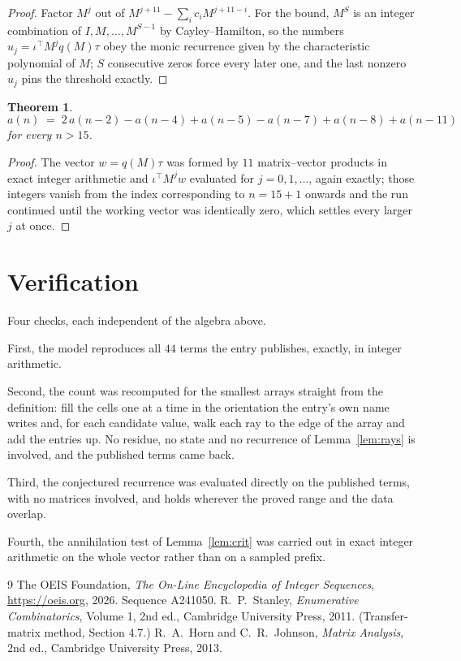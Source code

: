 \documentclass[11pt,a4paper]{article}
\theoremstyle{plain}
\newtheorem{theorem}{Theorem}
\theoremstyle{definition}
\begin{document}
\begin{proof}
Factor $M^{j}$ out of $M^{j+11}-\sum_ic_iM^{j+11-i}$. For the bound, $M^{S}$
is an integer combination of $I,M,\dots,M^{S-1}$ by Cayley--Hamilton, so the numbers
$u_j=\iota^{\!\top}M^{j}q(M)\tau$ obey the monic recurrence given by the characteristic
polynomial of $M$; $S$ consecutive zeros force every later one, and the last nonzero $u_j$
pins the threshold exactly.
\end{proof}

\begin{theorem}
\[
a(n)\;=\;2\,a(n-2) - a(n-4) + a(n-5) - a(n-7) + a(n-8) + a(n-11)
\]
for every $n>15$.
\end{theorem}

\begin{proof}
The vector $w=q(M)\tau$ was formed by $11$ matrix--vector products in exact integer
arithmetic and $\iota^{\!\top}M^{j}w$ evaluated for $j=0,1,\dots$, again exactly; those
integers vanish from the index corresponding to $n=15+1$ onwards and the run continued
until the working vector was identically zero, which settles every larger $j$ at once.
\end{proof}

\section{Verification}

Four checks, each independent of the algebra above.

First, the model reproduces all $44$ terms the entry publishes, exactly, in integer
arithmetic.

Second, the count was recomputed for the smallest arrays straight from the definition: fill the
cells one at a time in the orientation the entry's own name writes and, for each candidate
value, walk each ray to the edge of the array and add the entries up. No residue, no state and
no recurrence of Lemma~\ref{lem:rays} is involved, and the published terms came back.

Third, the conjectured recurrence was evaluated directly on the published terms, with no
matrices involved, and holds wherever the proved range and the data overlap.

Fourth, the annihilation test of Lemma~\ref{lem:crit} was carried out in exact integer
arithmetic on the whole vector rather than on a sampled prefix.

\begin{thebibliography}{9}
 The OEIS Foundation, \emph{The On-Line Encyclopedia of Integer
Sequences}, \url{https://oeis.org}, 2026. Sequence A241050.
 R.~P.~Stanley, \emph{Enumerative Combinatorics}, Volume 1, 2nd ed.,
Cambridge University Press, 2011. (Transfer-matrix method, Section 4.7.)
 R.~A.~Horn and C.~R.~Johnson, \emph{Matrix Analysis}, 2nd ed., Cambridge
University Press, 2013.
\end{thebibliography}
\end{document}
